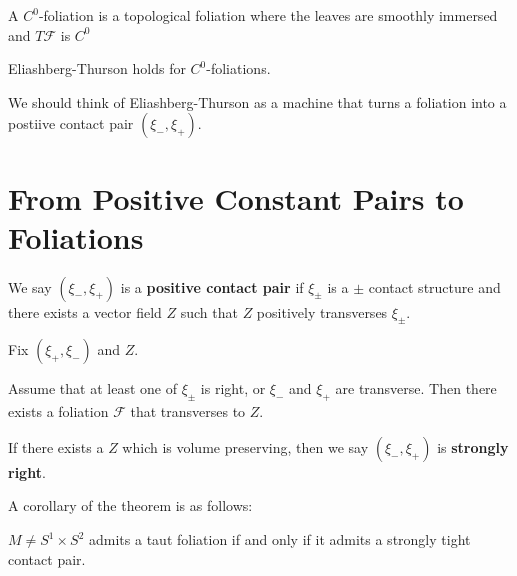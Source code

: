 \begin{definition}

A $C^0$-foliation is a topological foliation where the leaves are smoothly immersed and $T\mathcal{F}$ is $C^0$

\end{definition}

\begin{theorem}

Eliashberg-Thurson holds for $C^0$-foliations.

\end{theorem}

We should think of Eliashberg-Thurson as a machine that turns a foliation into a postiive contact pair $(\xi_-, \xi_+)$.

\section{From Positive Constant Pairs to Foliations}

\begin{definition}

We say $(\xi_-, \xi_+)$ is a \textbf{positive contact pair} if $\xi_\pm$ is a $\pm$ contact structure and there exists a vector field $Z$ such that $Z$ positively transverses $\xi_\pm$.

\end{definition}

Fix $(\xi_+, \xi_-)$ and $Z$.

\begin{theorem}
[Massoni, 2024]

Assume that at least one of $\xi_\pm$ is right, or $\xi_-$ and $\xi_+$ are transverse. Then there exists a foliation $\mathcal{F}$ that transverses to $Z$.

\end{theorem}

\begin{definition}

If there exists a $Z$ which is volume preserving, then we say $(\xi_-, \xi_+)$ is \textbf{strongly right}.

\end{definition}

A corollary of the theorem is as follows:

\begin{corollary}

$M\neq S^1\times S^2$ admits a taut foliation if and only if it admits a strongly tight contact pair.

\end{corollary}

